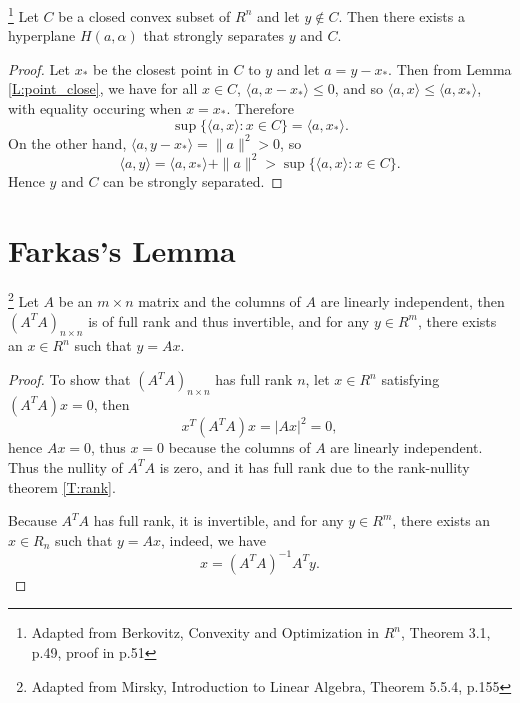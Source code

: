 \begin{theorem} \label{T:sep_plane}
\footnote{Adapted from Berkovitz, Convexity and Optimization in $R^n$, 
          Theorem 3.1, p.49, proof in p.51}
Let $C$ be a closed convex subset of $R^n$ and let $y\notin C$. Then there 
exists a hyperplane $H(a,{\alpha})$ that strongly separates $y$ and $C$.
\end{theorem}
\begin{proof}
Let $x_*$ be the closest point in $C$ to $y$ and let $a=y-x_*$. Then from
Lemma \ref{L:point_close}, we have for all $x\in C$, 
$\langle a,x-x_* \rangle \le 0$, and so 
$\langle a,x \rangle \le \langle a,x_* \rangle$,
with equality occuring when $x=x_*$. Therefore
\[
  \sup\{\langle a,x \rangle : x\in C\} = \langle a,x_* \rangle.
\]
On the other hand,
$\langle a,y-x_* \rangle = \| a \|^2 >0$, so
\[
  \langle a,y \rangle 
    = \langle a,x_* \rangle + \| a \|^2
    > \sup\{\langle a,x \rangle : x\in C\}. 
\]
Hence $y$ and $C$ can be strongly separated.
\end{proof}


\section{Farkas's Lemma}

\begin{lemma} \label{L:rank_prod}
\footnote{Adapted from Mirsky, Introduction to Linear Algebra, Theorem 5.5.4,
p.155}
Let $A$ be an $m\times n$ matrix and the columns of $A$ are linearly 
independent, then $(A^T A)_{n\times n}$ is of full rank and thus invertible, 
and for any $y\in R^m$, there exists an $x\in R^n$ such that $y=Ax$. 
\end{lemma}
\begin{proof}
To show that $(A^T A)_{n\times n}$ has full rank $n$, let $x\in R^n$ satisfying
$(A^T A)x=0$, then
\[
  x^T (A^T A) x = |Ax|^2 = 0,
\]
hence $Ax=0$, thus $x=0$ because the columns of $A$ are linearly independent.
Thus the nullity of $A^T A$ is zero, and it has full rank due to the rank-nullity
theorem \ref{T:rank}.

Because $A^T A$ has full rank, it is invertible, and for any $y\in R^m$,
there exists an $x\in R_n$ such that $y=Ax$, indeed, we have
\[
  x = (A^T A)^{-1} A^T y.
\]
\end{proof}


